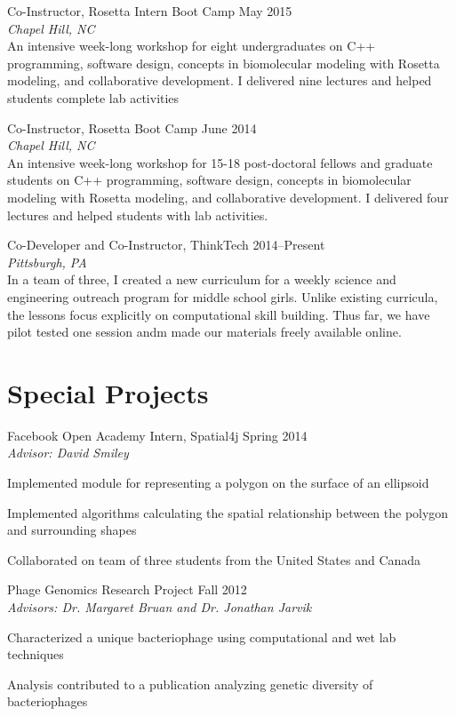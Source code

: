\documentclass[11pt]{article}
\newcommand{\allcapsspacing}[1]{{\addfontfeature{LetterSpace=7.5}#1}}
\newcommand{\outreachitem}[4]{
{#1} \hfill {#2} \\
#3 \smallskip
#4 
\par\vspace{0.5\baselineskip}}
\newcommand{\researchitem}[4]{
\outreachitem{#1}{#2}{\textit{#3}}{\vspace{0\baselineskip}#4}}
\begin{document}
\researchitem{Co-Instructor, Rosetta Intern Boot Camp}{May 2015}{Chapel Hill, NC}{\\An intensive week-long workshop for eight undergraduates on C++ programming, software design, concepts in biomolecular modeling with Rosetta modeling, and collaborative development. I delivered nine lectures and helped students complete lab activities}

\researchitem{Co-Instructor, Rosetta Boot Camp}{June 2014}{Chapel Hill, NC}{\\An intensive week-long workshop for 15-18 post-doctoral fellows and graduate students on C++ programming, software design, concepts in biomolecular modeling with Rosetta modeling, and collaborative development. I delivered four lectures and helped students with lab activities.}

\researchitem{Co-Developer and Co-Instructor, ThinkTech}{2014--Present}{Pittsburgh, PA}{\\In a team of three, I created a new curriculum for a weekly science and engineering outreach program for middle school girls. Unlike existing curricula, the lessons focus explicitly on computational skill building. Thus far, we have pilot tested one session andm made our materials freely available online.}

\section*{\allcapsspacing{Special Projects}}

\researchitem{Facebook Open Academy Intern, Spatial4j}{Spring 2014}{Advisor: David Smiley}{
\begin{compactitem}
\item Implemented module for representing a polygon on the surface of an ellipsoid
\item Implemented algorithms calculating the spatial relationship between the polygon and surrounding shapes
\item Collaborated on team of three students from the United States and Canada
\end{compactitem}
}

\researchitem{Phage Genomics Research Project}{Fall 2012}{Advisors: Dr. Margaret Bruan and Dr. Jonathan Jarvik}{
\begin{compactitem}
\item Characterized a unique bacteriophage using computational and wet lab techniques
\item Analysis contributed to a publication analyzing genetic diversity of bacteriophages
\end{compactitem}
}
\end{document}

